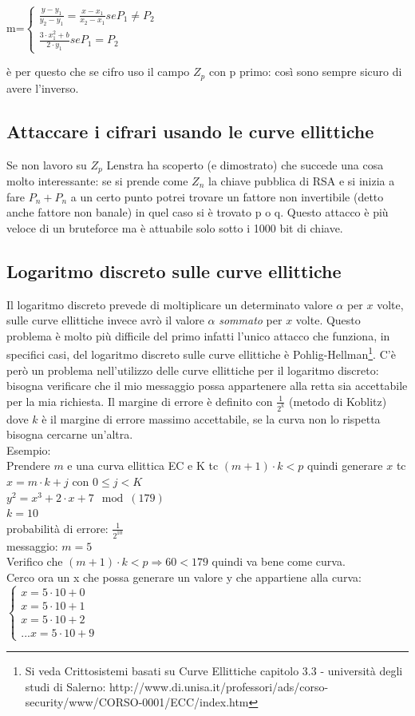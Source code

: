 \documentclass[10pt,a4paper]{article}
\begin{document}
m=$
\begin{cases}
\frac{y-y_1}{y_2-y_1}=\frac{x-x_1}{x_2-x_1} se P_1 \not= P_2\\
\frac{3\cdot x_1^2+b}{2\cdot y_1} se P_1 = P_2
\end{cases}$

è per questo che se cifro uso il campo $Z_p$ con p primo: così sono sempre sicuro di avere l'inverso.

\subsection{Attaccare i cifrari usando le curve ellittiche}
Se non lavoro su $Z_p$ Lenstra ha scoperto (e dimostrato) che succede una cosa molto interessante: se si prende come $Z_n$ la chiave pubblica di RSA e si inizia a fare $P_n+P_n$ a un certo punto potrei trovare un fattore non invertibile (detto anche fattore non banale) in quel caso si è trovato p o q. Questo attacco è più veloce di un bruteforce ma è attuabile solo sotto i 1000 bit di chiave.

\subsection{Logaritmo discreto sulle curve ellittiche}
Il logaritmo discreto prevede di moltiplicare un determinato valore $\alpha$ per $x$ volte, sulle curve ellittiche invece avrò il valore $\alpha$ \textit{sommato} per $x$ volte. Questo problema è molto più difficile del primo infatti l'unico attacco che funziona, in specifici casi, del logaritmo discreto sulle curve ellittiche è Pohlig-Hellman\footnote{Si veda Crittosistemi basati su Curve Ellittiche capitolo 3.3 - università degli studi di Salerno: http://www.di.unisa.it/professori/ads/corso-security/www/CORSO-0001/ECC/index.htm}. C'è però un problema nell'utilizzo delle curve ellittiche per il logaritmo discreto: bisogna verificare che il mio messaggio possa appartenere alla retta sia accettabile per la mia richiesta. Il margine di errore è definito con $\frac{1}{2^k}$ (metodo di Koblitz) dove $k$ è il margine di errore massimo accettabile, se la curva non lo rispetta bisogna cercarne un'altra.\\
Esempio:\\
Prendere $m$ e una curva ellittica EC e K tc $(m+1)\cdot k < p$ quindi generare $x$ tc $x=m\cdot k +j$ con
$0\leq j < K$\\

$y^2=x^3+2\cdot x+7 \mod(179)$\\
$k=10$\\
probabilità di errore: $\frac{1}{2^10}$\\
messaggio: $m=5$\\
Verifico che $(m+1)\cdot k < p \Rightarrow 60<179$ quindi va bene come curva.\\
Cerco ora un x che possa generare un valore y che appartiene alla curva:\\
$\begin{cases}
x=5\cdot10+0\\
x=5\cdot10+1\\
x=5\cdot10+2\\
...
x=5\cdot10+9
\end{cases}
$
\end{document}
